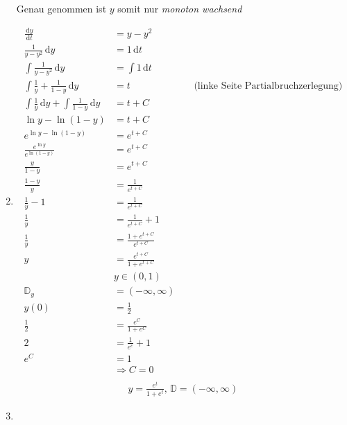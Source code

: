 \documentclass[fleqn,12pt]{scrartcl}
\newcommand{\id}{\, \mathrm{d}}
\newcommand{\abl}[2]{
	\frac{\id #1}{\id #2}
}
\begin{document}
\begin{enumerate}
		Genau genommen ist $y$ somit nur \emph{monoton wachsend}
	\item
		\begin{align*}
			\abl yt &= y - y^2\\
			\frac1{y-y^2} \id y &= 1 \id t\\
			\int \frac1{y-y^2} \id y &= \int 1 \id t\\
			\int \frac1y + \frac1{1-y} \id y &= t && \text{ (linke Seite Partialbruchzerlegung)}\\
			\int \frac1y \id  y + \int \frac1{1-y} \id y &= t + C\\
			\ln y - \ln(1-y) &= t + C\\
			e^{\ln y - \ln(1-y)} &= e^{t+C}\\
			\frac{e^{\ln y}}{e^{\ln (1-y)}} &= e^{t+C}\\
			\frac{y}{1-y} &= e^{t+C}\\
			\frac{1-y}{y} &= \frac1{e^{t+C}}\\
			\frac1y - 1 &= \frac1{e^{t+C}}\\
			\frac1y &= \frac1{e^{t+C}} + 1\\
			\frac1y &= \frac{1+e^{t+C}}{e^{t+C}}\\
			y &= \frac{e^{t+C}}{1+e^{t+C}}\\
			&y\in (0, 1)\\
			\mathbb{D}_y &= (-\infty, \infty)\\
			y(0) &= \frac12\\
			\frac12 &= \frac{e^C}{1+e^C} \\
			2 &= \frac1{e^c} + 1\\
			e^C &= 1\\
					&\Rightarrow C=0\\
		\end{align*}
		\begin{align*}
			y = \frac{e^t}{1+e^t}, \, \mathbb{D} = (-\infty, \infty)
		\end{align*}
	\item \quad \\

\end{enumerate}
\end{document}
